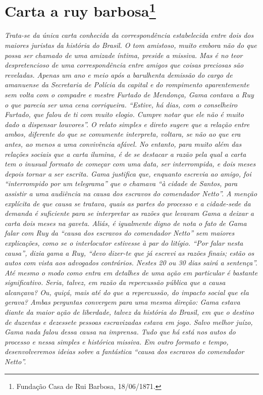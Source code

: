 \chapter{Carta a ruy barbosa\footnote{Fundação Casa de Rui Barbosa, 18/06/1871.}}%

\begin{didascalia}
\emph{Trata-se da única carta conhecida da correspondência estabelecida
entre dois dos maiores juristas da história do Brasil. O tom amistoso,
muito embora não do que possa ser chamado de uma amizade íntima, preside
a missiva. Mas é no teor despretencioso de uma correspondência entre
amigos que coisas preciosas são reveladas. Apenas um ano e meio após a
barulhenta demissão do cargo de amanuense da Secretaria de Polícia da
capital e do rompimento aparentemente sem volta com o compadre e mestre
Furtado de Mendonça, Gama contava a Ruy o que parecia ser uma cena
corriqueira. ``Estive, há dias, com o conselheiro Furtado, que falou de
ti com muito elogio. Cumpre notar que ele não é muito dado a dispensar
louvores''. O relato simples e direto sugere que a relação entre ambos,
diferente do que se comumente interpreta, voltara, se não ao que era
antes, ao menos a uma convivência afável. No entanto, para muito além
das relações sociais que a carta ilumina, é de se destacar a razão pela
qual a carta tem o inusual formato de começar com uma data, ser
interrompida, e dois meses depois tornar a ser escrita. Gama justifica
que, enquanto escrevia ao amigo, foi ``interrompido por um telegrama'' que
o chamava ``à cidade de Santos, para assistir a uma audiência na causa
dos escravos do comendador Netto''. A menção explícita de que causa se
tratava, quais as partes do processo e a cidade-sede da demanda é
suficiente para se interpretar as razões que levavam Gama a deixar a
carta dois meses na gaveta. Aliás, é igualmente digno de nota o fato de
Gama falar com Ruy da ``causa dos escravos do comendador Netto'' sem
maiores explicações, como se o interlocutor estivesse à par do litígio.
``Por falar nesta causa'', dizia gama a Ruy, ``devo dizer-te que já escrevi
as razões finais; estão os autos com vista aos advogados contrários.
Nestes 20 ou 30 dias sairá a sentença''. Até mesmo o modo como entra em
detalhes de uma ação em particular é bastante significativo. Seria,
talvez, em razão da repercussão pública que a causa alcançava? Ou,
quiçá, mais até do que a repercussão, do impacto social que ela gerava?
Ambas perguntas convergem para uma mesma direção: Gama estava diante da
maior ação de liberdade, talvez da história do Brasil, em que o destino
de duzentas e dezessete pessoas escravizadas estava em jogo. Salvo
melhor juízo, Gama nada falou dessa causa na imprensa. Tudo que há está
nos autos do processo e nessa simples e histórica missiva. Em outro
formato e tempo, desenvolveremos ideias sobre a fantástica ``causa dos
escravos do comendador Netto''.}
\end{didascalia}

